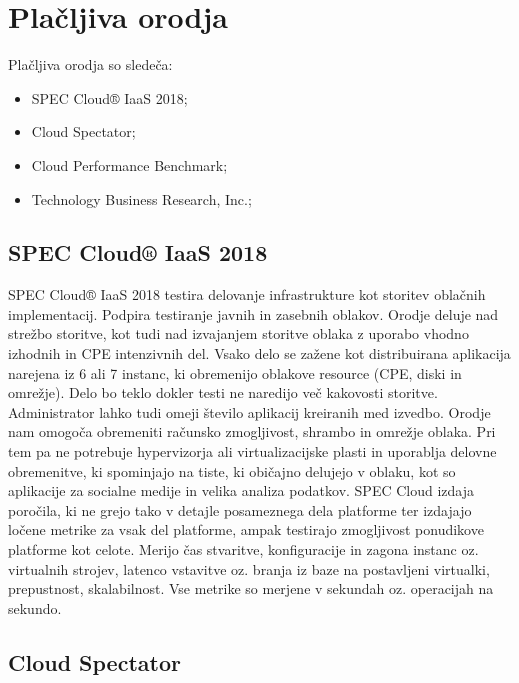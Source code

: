 \section{Plačljiva orodja}
Plačljiva orodja so sledeča:
\begin{itemize}
\item SPEC Cloud® IaaS 2018;
\item Cloud Spectator;
\item Cloud Performance Benchmark;
\item Technology Business Research, Inc.;
\end{itemize}

\subsection{SPEC Cloud® IaaS 2018}

SPEC Cloud® IaaS 2018 testira delovanje infrastrukture kot storitev oblačnih implementacij. Podpira testiranje javnih in zasebnih oblakov. Orodje deluje nad strežbo storitve, kot tudi nad izvajanjem storitve oblaka z uporabo vhodno izhodnih in CPE intenzivnih del. Vsako delo se zažene kot distribuirana aplikacija narejena iz 6 ali 7 instanc, ki obremenijo oblakove resource (CPE, diski in omrežje). Delo bo teklo dokler testi ne naredijo več kakovosti storitve. Administrator lahko tudi omeji število aplikacij kreiranih med izvedbo.
Orodje nam omogoča obremeniti računsko zmogljivost, shrambo in omrežje oblaka. Pri tem pa ne potrebuje hypervizorja ali virtualizacijske plasti in uporablja delovne obremenitve, ki spominjajo na tiste, ki običajno delujejo v oblaku, kot so aplikacije za socialne medije in velika analiza podatkov.
SPEC Cloud izdaja poročila, ki ne grejo tako v detajle posameznega dela platforme ter izdajajo ločene metrike za vsak del platforme, ampak testirajo zmogljivost ponudikove platforme kot celote. Merijo čas stvaritve, konfiguracije in zagona instanc oz. virtualnih strojev, latenco vstavitve oz. branja iz baze na postavljeni virtualki, prepustnost, skalabilnost. Vse metrike so merjene v sekundah oz. operacijah na sekundo.

\subsection{Cloud Spectator}

